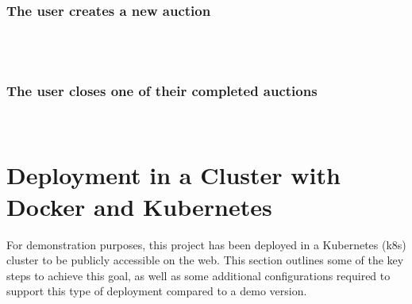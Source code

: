 \documentclass[12pt, a4paper, renqo, final]{amsart}
\let\stdsection\section
\renewcommand{\section}{\newpage\stdsection}
\begin{document}
			\subsubsection{The user creates a new auction}
				\phantom{.}\\
				\noindent {}	
				\phantom{.}\\
			\subsubsection{The user closes one of their completed auctions}
				\phantom{.}\\
				\noindent {}					
				\newpage
		\section{Deployment in a Cluster with Docker and Kubernetes}
		\lstset{language=XML}
		For demonstration purposes, this project has been deployed in a Kubernetes (k8s) cluster to be publicly accessible on the web. This section outlines some of the key steps to achieve this goal, as well as some additional configurations required to support this type of deployment compared to a demo version.
\end{document}

